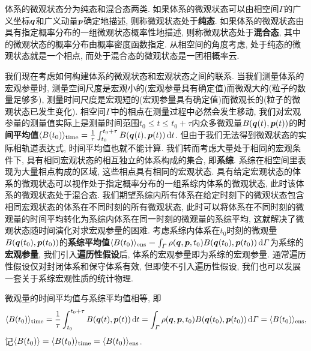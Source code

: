 体系的微观状态分为纯态和混合态两类. 如果体系的微观状态可以由相空间$ \varGamma $的广义坐标$ \vb*{q} $和广义动量$ \vb*{p} $确定地描述, 则称微观状态处于\textbf{纯态}. 如果体系的微观状态由具有指定概率分布的一组微观状态概率性地描述, 则称微观状态处于\textbf{混合态}, 其中的微观状态的概率分布由概率密度函数指定. 从相空间的角度考虑, 处于纯态的微观状态就是一个相点, 而处于混合态的微观状态是一团相概率云.

我们现在考虑如何构建体系的微观状态和宏观状态之间的联系. 当我们测量体系的宏观参量时, 测量空间尺度是宏观小的(宏观参量具有确定值)而微观大的(粒子的数量足够多), 测量时间尺度是宏观短的(宏观参量具有确定值)而微观长的(粒子的微观状态已发生变化). 相空间$ \varGamma $中的相点在测量过程中必然会发生移动, 我们对宏观参量的测量值实际上是测量时间范围$ t_0 \leq t \leq t_0 + \tau $内众多微观量$ B(\vb*{q}(t),\vb*{p}(t)) $的\textbf{时间平均值}$ \langle B(t_0) \rangle_{\mathrm{time}} = \frac{1}{\tau} \int_{t_0}^{t_0+\tau} B(\vb*{q}(t),\vb*{p}(t))\dd{t} $. 但由于我们无法得到微观状态的实际相轨道表达式, 时间平均值也就不能计算. 我们转而考虑大量处于相同的宏观条件下, 具有相同宏观状态的相互独立的体系构成的集合, 即\textbf{系综}. 系综在相空间里表现为大量相点构成的区域, 这些相点具有相同的宏观状态. 具有给定宏观状态的体系的微观状态可以视作处于指定概率分布的一组系综内体系的微观状态, 此时该体系的微观状态处于混合态. 我们期望系综内所有体系在给定时刻下的微观状态包含相同宏观状态的体系在不同时刻的所有微观状态, 此时可以将体系在不同时刻的微观量的时间平均转化为系综内体系在同一时刻的微观量的系综平均, 这就解决了微观状态随时间演化对求宏观参量的困难. 考虑系综内体系在$ t_0 $时刻的微观量$ B(\vb*{q}(t_0),\vb*{p}(t_0)) $的\textbf{系综平均值}$ \langle B(t_0) \rangle_{\mathrm{ens}} = \int_{\varGamma} \rho(\vb*{q},\vb*{p},t_0) B(\vb*{q}(t_0),\vb*{p}(t_0)) \dd{\varGamma} $为系综的\textbf{宏观参量}, 我们引入\textbf{遍历性假设}后, 体系的宏观参量即为系综的宏观参量. 通常遍历性假设仅对封闭体系和保守体系有效, 但即使不引入遍历性假设, 我们也可以发展一套关于系综宏观性质的统计物理.

\begin{postulate}[遍历性假设]\label{pos:遍历性假设}
    微观量的时间平均值与系综平均值相等, 即
    \begin{equation}
        \langle B(t_0) \rangle_{\mathrm{time}} = \frac{1}{\tau} \int_{t_0}^{t_0+\tau} B(\vb*{q}(t),\vb*{p}(t))\dd{t} = \int_{\varGamma} \rho(\vb*{q},\vb*{p},t_0) B(\vb*{q}(t_0),\vb*{p}(t_0)) \dd{\varGamma} = \langle B(t_0) \rangle_{\mathrm{ens}},
    \end{equation}
    记$ \langle B(t_0)\rangle = \langle B(t_0) \rangle_{\mathrm{time}} = \langle B(t_0) \rangle_{\mathrm{ens}} $.
\end{postulate}

